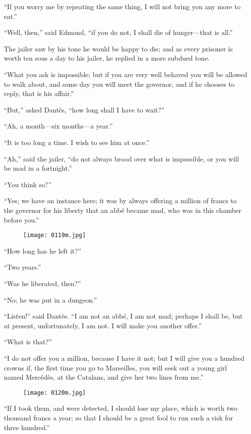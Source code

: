 “If you worry me by repeating the same thing, I will not bring you any
more to eat.”

“Well, then,” said Edmond, “if you do not, I shall die of hunger—that
is all.”

The jailer saw by his tone he would be happy to die; and as every
prisoner is worth ten sous a day to his jailer, he replied in a more
subdued tone.

“What you ask is impossible; but if you are very well behaved you will
be allowed to walk about, and some day you will meet the governor, and
if he chooses to reply, that is his affair.”

“But,” asked Dantès, “how long shall I have to wait?”

“Ah, a month—six months—a year.”

“It is too long a time. I wish to see him at once.”

“Ah,” said the jailer, “do not always brood over what is impossible, or
you will be mad in a fortnight.”

“You think so?”

“Yes; we have an instance here; it was by always offering a million of
francs to the governor for his liberty that an abbé became mad, who was
in this chamber before you.”

\begin{figure}[h]
\texttt{[image: 0119m.jpg]}
\end{figure}

“How long has he left it?”

“Two years.”

“Was he liberated, then?”

“No; he was put in a dungeon.”

“Listen!” said Dantès. “I am not an abbé, I am not mad; perhaps I shall
be, but at present, unfortunately, I am not. I will make you another
offer.”

“What is that?”

“I do not offer you a million, because I have it not; but I will give
you a hundred crowns if, the first time you go to Marseilles, you will
seek out a young girl named Mercédès, at the Catalans, and give her two
lines from me.”

\begin{figure}[h]
\texttt{[image: 0120m.jpg]}
\end{figure}

“If I took them, and were detected, I should lose my place, which is
worth two thousand francs a year; so that I should be a great fool to
run such a risk for three hundred.”

